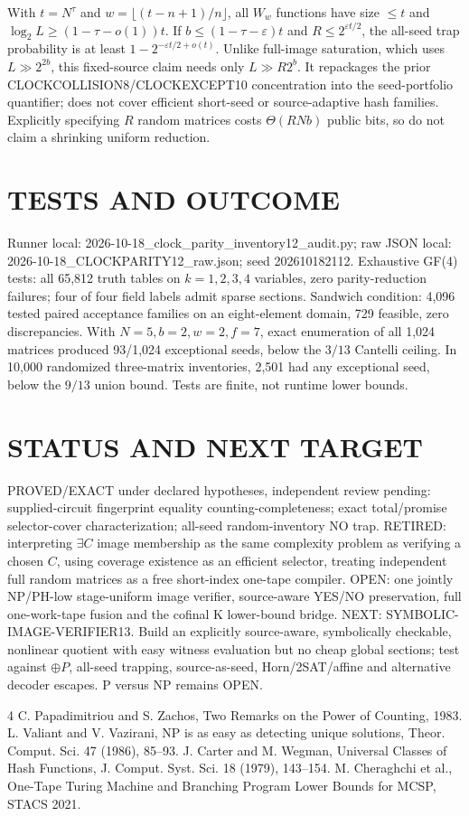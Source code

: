 \documentclass[11pt]{article}
\begin{document}
\noindent With $t=N^\tau$ and $w=\lfloor(t-n+1)/n\rfloor$, all $W_w$ functions have size $\le t$ and $\log_2 L\ge(1-\tau-o(1))t$. If $b\le(1-\tau-\varepsilon)t$ and $R\le2^{\varepsilon t/2}$, the all-seed trap probability is at least $1-2^{-\varepsilon t/2+o(t)}$. Unlike full-image saturation, which uses $L\gg2^{2b}$, this fixed-source claim needs only $L\gg R2^b$. It repackages the prior CLOCKCOLLISION8/CLOCKEXCEPT10 concentration into the seed-portfolio quantifier; does not cover efficient short-seed or source-adaptive hash families. Explicitly specifying $R$ random matrices costs $\Theta(RNb)$ public bits, so do not claim a shrinking uniform reduction.

\section*{TESTS AND OUTCOME}
Runner local: 2026-10-18_clock_parity_inventory12_audit.py; raw JSON local: 2026-10-18_CLOCKPARITY12_raw.json; seed 202610182112. Exhaustive GF(4) tests: all 65,812 truth tables on $k=1,2,3,4$ variables, zero parity-reduction failures; four of four field labels admit sparse sections. Sandwich condition: 4,096 tested paired acceptance families on an eight-element domain, 729 feasible, zero discrepancies. With $N=5,b=2,w=2,f=7$, exact enumeration of all 1,024 matrices produced 93/1,024 exceptional seeds, below the $3/13$ Cantelli ceiling. In 10,000 randomized three-matrix inventories, 2,501 had any exceptional seed, below the $9/13$ union bound. Tests are finite, not runtime lower bounds.

\section*{STATUS AND NEXT TARGET}
PROVED/EXACT under declared hypotheses, independent review pending: supplied-circuit fingerprint equality counting-completeness; exact total/promise selector-cover characterization; all-seed random-inventory NO trap. RETIRED: interpreting $\exists C$ image membership as the same complexity problem as verifying a chosen $C$, using coverage existence as an efficient selector, treating independent full random matrices as a free short-index one-tape compiler. OPEN: one jointly NP/PH-low stage-uniform image verifier, source-aware YES/NO preservation, full one-work-tape fusion and the cofinal K lower-bound bridge. NEXT: SYMBOLIC-IMAGE-VERIFIER13. Build an explicitly source-aware, symbolically checkable, nonlinear quotient with easy witness evaluation but no cheap global sections; test against $\oplus P$, all-seed trapping, source-as-seed, Horn/2SAT/affine and alternative decoder escapes. P versus NP remains OPEN.

\begin{thebibliography}{4}
 C. Papadimitriou and S. Zachos, Two Remarks on the Power of Counting, 1983.
 L. Valiant and V. Vazirani, NP is as easy as detecting unique solutions, Theor. Comput. Sci. 47 (1986), 85--93.
 J. Carter and M. Wegman, Universal Classes of Hash Functions, J. Comput. Syst. Sci. 18 (1979), 143--154.
 M. Cheraghchi et al., One-Tape Turing Machine and Branching Program Lower Bounds for MCSP, STACS 2021.
\end{thebibliography}
\end{document}

